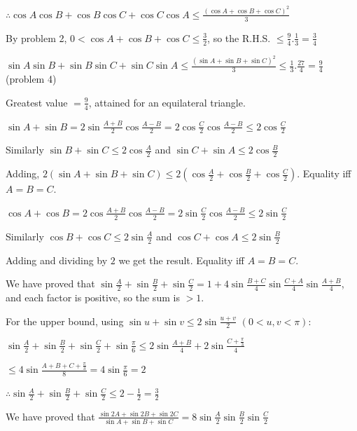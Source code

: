   $\therefore \cos A\cos B + \cos B\cos C + \cos C\cos A \leq \frac{(\cos A + \cos B + \cos C)^2}{3}$

  By problem 2, $0 < \cos A + \cos B + \cos C \leq \frac{3}{2}$, so the R.H.S. $\leq \frac{9}{4}.\frac{1}{3} =
  \frac{3}{4}$

\item $\sin A\sin B + \sin B\sin C + \sin C\sin A \leq \frac{(\sin A + \sin B + \sin C)^2}{3} \leq
  \frac{1}{3}.\frac{27}{4} = \frac{9}{4}$ (problem 4)

  Greatest value $= \frac{9}{4}$, attained for an equilateral triangle.

\item $\sin A + \sin B = 2\sin\frac{A + B}{2}\cos\frac{A - B}{2} = 2\cos\frac{C}{2}\cos\frac{A - B}{2} \leq
  2\cos\frac{C}{2}$

  Similarly $\sin B + \sin C \leq 2\cos\frac{A}{2}$ and $\sin C + \sin A \leq 2\cos\frac{B}{2}$

  Adding, $2(\sin A + \sin B + \sin C) \leq 2\left(\cos\frac{A}{2} + \cos\frac{B}{2} + \cos\frac{C}{2}\right)$.
  Equality iff $A = B = C$.

\item $\cos A + \cos B = 2\cos\frac{A + B}{2}\cos\frac{A - B}{2} = 2\sin\frac{C}{2}\cos\frac{A - B}{2} \leq
  2\sin\frac{C}{2}$

  Similarly $\cos B + \cos C \leq 2\sin\frac{A}{2}$ and $\cos C + \cos A \leq 2\sin\frac{B}{2}$

  Adding and dividing by $2$ we get the result. Equality iff $A = B = C$.

\item We have proved that $\sin\frac{A}{2} + \sin\frac{B}{2} + \sin\frac{C}{2} = 1 + 4\sin\frac{B + C}{4}\sin\frac{C +
  A}{4}\sin\frac{A + B}{4}$, and each factor is positive, so the sum is $> 1$.

  For the upper bound, using $\sin u + \sin v \leq 2\sin\frac{u + v}{2}$ $(0 < u, v < \pi)$:

  $\sin\frac{A}{2} + \sin\frac{B}{2} + \sin\frac{C}{2} + \sin\frac{\pi}{6} \leq 2\sin\frac{A + B}{4} + 2\sin\frac{C +
    \frac{\pi}{3}}{4}$

  $\leq 4\sin\frac{A + B + C + \frac{\pi}{3}}{8} = 4\sin\frac{\pi}{6} = 2$

  $\therefore \sin\frac{A}{2} + \sin\frac{B}{2} + \sin\frac{C}{2} \leq 2 - \frac{1}{2} = \frac{3}{2}$

\item We have proved that $\frac{\sin 2A + \sin 2B + \sin 2C}{\sin A + \sin B + \sin C} =
  8\sin\frac{A}{2}\sin\frac{B}{2}\sin\frac{C}{2}$

